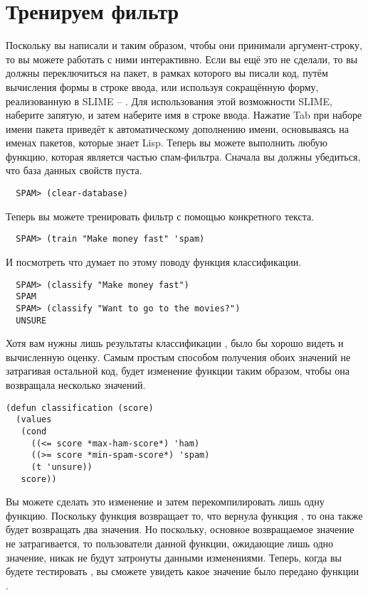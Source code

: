 \section{Тренируем фильтр}

Поскольку вы написали  и  таким образом, чтобы они принимали
аргумент-строку, то вы можете работать с ними интерактивно.  Если вы ещё это не сделали,
то вы должны переключиться на пакет, в рамках которого вы писали код, путём вычисления
формы  в строке ввода, или используя сокращённую форму, реализованную в
SLIME -- .  Для использования этой возможности SLIME, наберите
запятую, и затем наберите имя в строке ввода.  Нажатие Tab при наборе имени пакета
приведёт к автоматическому дополнению имени, основываясь на именах пакетов, которые знает
Lisp.  Теперь вы можете выполнить любую функцию, которая является частью спам-фильтра.
Сначала вы должны убедиться, что база данных свойств пуста.

\begin{verbatim}
  SPAM> (clear-database)
\end{verbatim}

Теперь вы можете тренировать фильтр с помощью конкретного текста.

\begin{verbatim}
  SPAM> (train "Make money fast" 'spam)
\end{verbatim}

И посмотреть что думает по этому поводу функция классификации.

\begin{verbatim}
  SPAM> (classify "Make money fast")
  SPAM
  SPAM> (classify "Want to go to the movies?")
  UNSURE
\end{verbatim}

Хотя вам нужны лишь результаты классификации , было бы хорошо видеть и вычисленную оценку.
Самым простым способом получения обоих значений не затрагивая остальной код, будет
изменение функции  таким образом, чтобы она возвращала несколько
значений.

\begin{lstlisting}
(defun classification (score)
  (values
   (cond
     ((<= score *max-ham-score*) 'ham)
     ((>= score *min-spam-score*) 'spam)
     (t 'unsure))
   score))
\end{lstlisting}

Вы можете сделать это изменение и затем перекомпилировать лишь одну функцию.  Поскольку
функция  возвращает то, что вернула функция , то она
также будет возвращать два значения.  Но поскольку, основное возвращаемое значение не
затрагивается, то пользователи данной функции, ожидающие лишь одно значение, никак не
будут затронуты данными изменениями.  Теперь, когда вы будете тестировать ,
вы сможете увидеть какое значение было передано функции .

